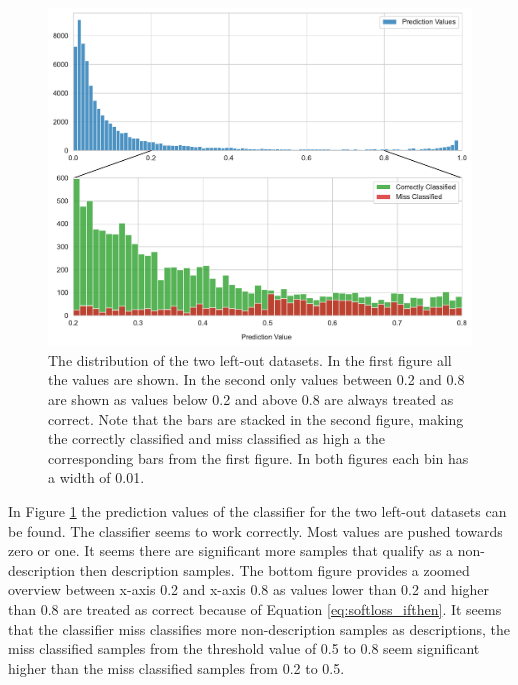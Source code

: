 \documentclass[a4paper, 12pt, oneside]{book} %
\begin{document}
\begin{figure}[h!]
 \centering
 \includegraphics[width=\textwidth]{figures/predictionvalues_external.pdf}
 \caption[Prediction values of left-out datasets]{The distribution of the two left-out datasets. In the first figure all the values are shown. In the second only values between 0.2 and 0.8 are shown as values below 0.2 and above 0.8 are always treated as correct. Note that the bars are stacked in the second figure, making the correctly classified and miss classified as high a the corresponding bars from the first figure. In both figures each bin has a width of 0.01.}
 \label{fig:predictionvalues_external}
\end{figure}

In Figure \ref{fig:predictionvalues_external} the prediction values of the classifier for the two left-out datasets can be found.
The classifier seems to work correctly.
Most values are pushed towards zero or one.
It seems there are significant more samples that qualify as a non-description then description samples.
The bottom figure provides a zoomed overview between x-axis 0.2 and x-axis 0.8 as values lower than 0.2 and higher than 0.8 are treated as correct because of Equation \ref{eq:softloss_ifthen}.
It seems that the classifier miss classifies more non-description samples as descriptions, the miss classified samples from the threshold value of 0.5 to 0.8 seem significant higher than the miss classified samples from 0.2 to 0.5.
\end{document}
